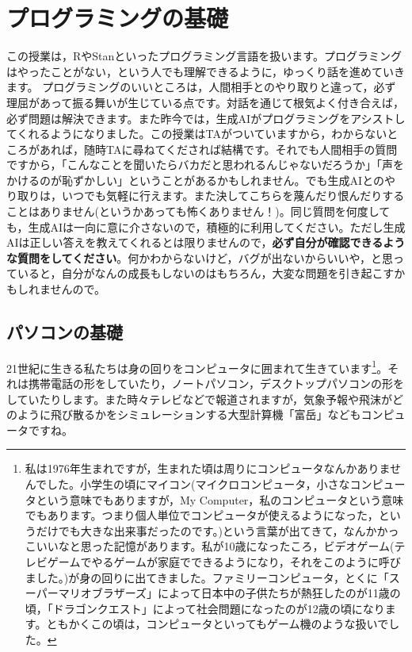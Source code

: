 \documentclass{ltjsbook}
\begin{document}
\chapter{プログラミングの基礎}
\label{x16_Programming1}
この授業は，RやStanといったプログラミング言語を扱います。プログラミングはやったことがない，という人でも理解できるように，ゆっくり話を進めていきます。
プログラミングのいいところは，人間相手とのやり取りと違って，必ず理屈があって振る舞いが生じている点です。対話を通じて根気よく付き合えば，必ず問題は解決できます。また昨今では，生成AIがプログラミングをアシストしてくれるようになりました。この授業はTAがついていますから，わからないところがあれば，随時TAに尋ねてくだされば結構です。それでも人間相手の質問ですから，「こんなことを聞いたらバカだと思われるんじゃないだろうか」「声をかけるのが恥ずかしい」ということがあるかもしれません。でも生成AIとのやり取りは，いつでも気軽に行えます。また決してこちらを蔑んだり恨んだりすることはありません(というかあっても怖くありません！)。同じ質問を何度しても，生成AIは一向に意に介さないので，積極的に利用してください。ただし生成AIは正しい答えを教えてくれるとは限りませんので，\textbf{必ず自分が確認できるような質問をしてください}。何かわからないけど，バグが出ないからいいや，と思っていると，自分がなんの成長もしないのはもちろん，大変な問題を引き起こすかもしれませんので。

\section{パソコンの基礎}

21世紀に生きる私たちは身の回りをコンピュータに囲まれて生きています\footnote{私は1976年生まれですが，生まれた頃は周りにコンピュータなんかありませんでした。小学生の頃にマイコン(マイクロコンピュータ，小さなコンピュータという意味でもありますが，My Computer，私のコンピュータという意味でもあります。つまり個人単位でコンピュータが使えるようになった，というだけでも大きな出来事だったのです。)という言葉が出てきて，なんかかっこいいなと思った記憶があります。私が10歳になったころ，ビデオゲーム(テレビゲームでやるゲームが家庭でできるようになり，それをこのように呼びました。)が身の回りに出てきました。ファミリーコンピュータ，とくに「スーパーマリオブラザーズ」によって日本中の子供たちが熱狂したのが11歳の頃，「ドラゴンクエスト」によって社会問題になったのが12歳の頃になります。ともかくこの頃は，コンピュータといってもゲーム機のような扱いでした。}。それは携帯電話の形をしていたり，ノートパソコン，デスクトップパソコンの形をしていたりします。また時々テレビなどで報道されますが，気象予報や飛沫がどのように飛び散るかをシミュレーションする大型計算機「富岳」などもコンピュータですね。
\end{document}
